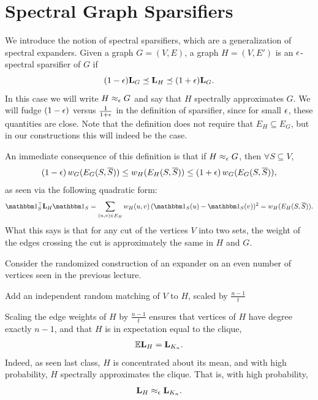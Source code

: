 \documentclass[11pt]{article}
\begin{document}
\section{Spectral Graph Sparsifiers}

We introduce the notion of spectral sparsifiers, which are a generalization of
spectral expanders. Given a graph $G = (V,E)$, a graph $H = (V,E')$ is an
$\epsilon$-spectral sparsifier of $G$ if \[(1-\eps)\V{L}_G \LE \V{L}_H \LE (1+\eps)\V{L}_G.\]
In this case we will write $H \approx_\epsilon G$ and say that $H$ spectrally
approximates $G$. We will fudge $(1-\epsilon)$ versus $\frac{1}{1+\epsilon}$ in the
definition of sparsifier, since for small $\epsilon$, these quantities are close.
Note that the definition does not require that $E_H \subseteq E_G$, but in our
constructions this will indeed be the case.

An immediate consequence of this definition is that if $H \approx_\epsilon G$, then
$\forall S \subseteq V$,
\[(1 - \epsilon) \, w_G(E_G(S, \overline{S})) \le
w_H(E_H(S, \overline{S})) \le (1 + \epsilon) \, w_G(E_G(S, \overline{S})),\]
as seen via the following quadratic form:
\[\ones_S^\T \V{L}_H \ones_S = \sum_{(u,v) \in E_H} w_H(u,v) \, (\ones_S(u) -
\ones_S(v))^2 = w_H(E_H(S,\overline{S})).\]
What this says is that for any cut of the vertices $V$ into
two sets, the weight of the edges crossing the cut is approximately
the same in $H$ and $G$.

Consider the randomized construction of an expander on an even number of
vertices seen in the previous lecture.

\begin{algorithm}
\caption*{$\textsc{Expander1}$:}
\begin{algorithmic}
\State{}
\Indent
    \vspace*{-0.2em}
    \State Add an independent random matching of $V$ to $H$,
        scaled by $\frac{n-1}{t}$
\EndIndent
\smallskip
\end{algorithmic}
\end{algorithm}

\newpage

\vspace*{-\baselineskip}
\vspace*{-\baselineskip}
\vspace*{-\baselineskip}
Scaling the edge weights of $H$ by $\frac{n-1}{t}$ ensures that vertices of $H$
have degree exactly $n-1$, and that $H$ is in expectation equal to the clique,
\[\E \V{L}_H = \V{L}_{K_n}.\] Indeed, as seen last class, $H$ is concentrated about its
mean, and with high probability, $H$ spectrally approximates the clique. That
is, with high probability, \[\V{L}_H \approx_\eps \V{L}_{K_n}.\]
\end{document}
